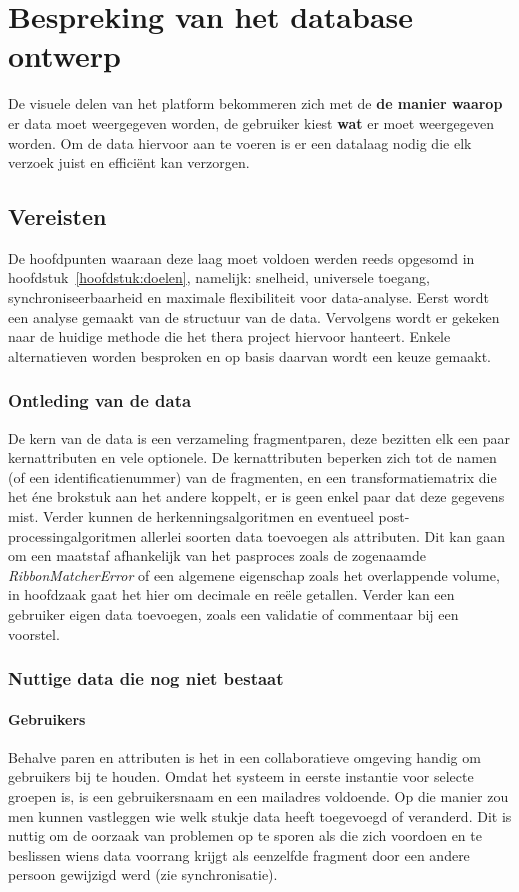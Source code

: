 \chapter{Bespreking van het database ontwerp}
\label{hoofdstuk:database}
De visuele delen van het platform bekommeren zich met de \textbf{de manier waarop} er data moet weergegeven worden, de gebruiker kiest \textbf{wat} er moet weergegeven worden. Om de data hiervoor aan te voeren is er een datalaag nodig die elk verzoek juist en effici\"ent kan verzorgen.

\section{Vereisten}
De hoofdpunten waaraan deze laag moet voldoen werden reeds opgesomd in hoofdstuk~\ref{hoofdstuk:doelen}, namelijk: snelheid, universele toegang, synchroniseerbaarheid en maximale flexibiliteit voor data-analyse. Eerst wordt een analyse gemaakt van de structuur van de data. Vervolgens wordt er gekeken naar de huidige methode die het thera project hiervoor hanteert. Enkele alternatieven worden besproken en op basis daarvan wordt een keuze gemaakt.

\subsection{Ontleding van de data}
De kern van de data is een verzameling fragmentparen, deze bezitten elk een paar kernattributen en vele optionele. De kernattributen beperken zich tot de namen (of een identificatienummer) van de fragmenten, en een transformatiematrix die het \'ene brokstuk aan het andere koppelt, er is geen enkel paar dat deze gegevens mist. Verder kunnen de herkenningsalgoritmen en eventueel post-processingalgoritmen allerlei soorten data toevoegen als attributen. Dit kan gaan om een maatstaf afhankelijk van het pasproces zoals de zogenaamde \emph{RibbonMatcherError}\cite{Brown2008} of een algemene eigenschap zoals het overlappende volume, in hoofdzaak gaat het hier om decimale en re\"ele getallen. Verder kan een gebruiker eigen data toevoegen, zoals een validatie of commentaar bij een voorstel.

\subsection{Nuttige data die nog niet bestaat}
\subsubsection{Gebruikers}
Behalve paren en attributen is het in een collaboratieve omgeving handig om gebruikers bij te houden. Omdat het systeem in eerste instantie voor selecte groepen is, is een gebruikersnaam en een mailadres voldoende. Op die manier zou men kunnen vastleggen wie welk stukje data heeft toegevoegd of veranderd. Dit is nuttig om de oorzaak van problemen op te sporen als die zich voordoen en te beslissen wiens data voorrang krijgt als eenzelfde fragment door een andere persoon gewijzigd werd (zie synchronisatie).

